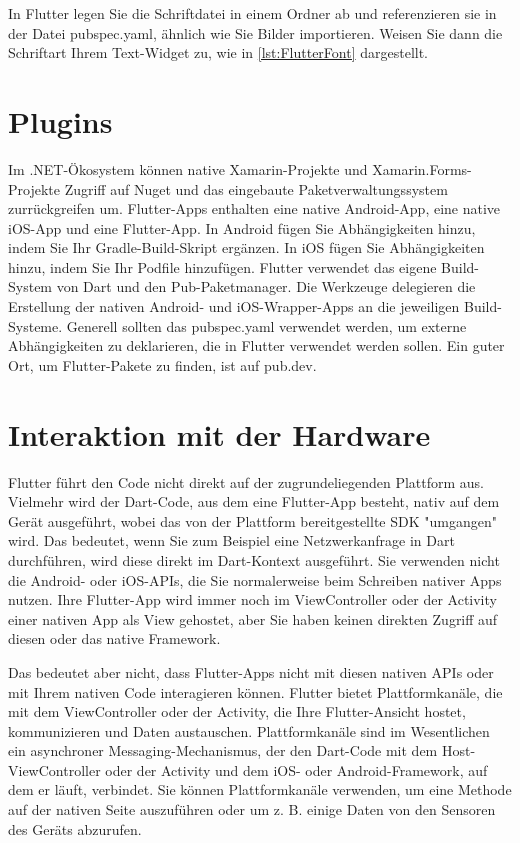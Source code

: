In Flutter legen Sie die Schriftdatei in einem Ordner ab und referenzieren sie in der Datei pubspec.yaml, ähnlich wie Sie Bilder importieren.
Weisen Sie dann die Schriftart Ihrem Text-Widget zu, wie in  \ref{lst:FlutterFont} dargestellt. 

\begin{minipage}{\linewidth}

\end{minipage}

\section{Plugins}
Im .NET-Ökosystem können native Xamarin-Projekte und Xamarin.Forms-Projekte Zugriff auf Nuget und das eingebaute Paketverwaltungssystem zurrückgreifen um.  Flutter-Apps enthalten eine native Android-App, eine native iOS-App und eine Flutter-App.
In Android fügen Sie Abhängigkeiten hinzu, indem Sie Ihr Gradle-Build-Skript ergänzen. In iOS fügen Sie Abhängigkeiten hinzu, indem Sie Ihr Podfile hinzufügen.
Flutter verwendet das eigene Build-System von Dart und den Pub-Paketmanager. Die Werkzeuge delegieren die Erstellung der nativen Android- und iOS-Wrapper-Apps an die jeweiligen Build-Systeme.
Generell sollten das pubspec.yaml verwendet werden, um externe Abhängigkeiten zu deklarieren, die in Flutter verwendet werden sollen. Ein guter Ort, um Flutter-Pakete zu finden, ist auf pub.dev.

\section{Interaktion mit der Hardware}

Flutter führt den Code nicht direkt auf der zugrundeliegenden Plattform aus. Vielmehr wird der Dart-Code, aus dem eine Flutter-App besteht, nativ auf dem Gerät ausgeführt, wobei das von der Plattform bereitgestellte SDK "umgangen" wird. Das bedeutet, wenn Sie zum Beispiel eine Netzwerkanfrage in Dart durchführen, wird diese direkt im Dart-Kontext ausgeführt. Sie verwenden nicht die Android- oder iOS-APIs, die Sie normalerweise beim Schreiben nativer Apps nutzen. Ihre Flutter-App wird immer noch im ViewController oder der Activity einer nativen App als View gehostet, aber Sie haben keinen direkten Zugriff auf diesen oder das native Framework.

Das bedeutet aber nicht, dass Flutter-Apps nicht mit diesen nativen APIs oder mit Ihrem nativen Code interagieren können. Flutter bietet Plattformkanäle, die mit dem ViewController oder der Activity, die Ihre Flutter-Ansicht hostet, kommunizieren und Daten austauschen. Plattformkanäle sind im Wesentlichen ein asynchroner Messaging-Mechanismus, der den Dart-Code mit dem Host-ViewController oder der Activity und dem iOS- oder Android-Framework, auf dem er läuft, verbindet. Sie können Plattformkanäle verwenden, um eine Methode auf der nativen Seite auszuführen oder um z. B. einige Daten von den Sensoren des Geräts abzurufen.

